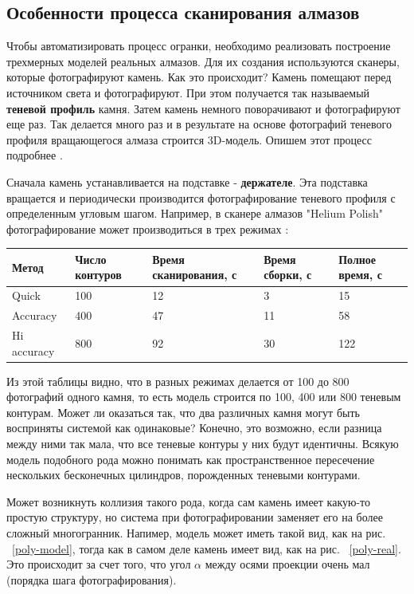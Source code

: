\documentclass[a4paper,12pt, titlepage]{article}
\begin{document}
\subsection{Особенности процесса сканирования алмазов}
\begin{flushleft}
Чтобы автоматизировать процесс огранки, необходимо реализовать построение трехмерных моделей
реальных алмазов. Для их создания используются сканеры, которые фотографируют камень. 
Как это происходит? Камень помещают перед источником света и фотографируют. При этом получается
так называемый \textbf{теневой профиль} камня. Затем камень немного поворачивают и фотографируют 
еще раз. Так делается много раз и в результате на основе фотографий теневого профиля вращающегося
алмаза строится 3D-модель. Опишем этот процесс подробнее \cite{doc-1}.
\end{flushleft}
\begin{flushleft}
 Сначала камень устанавливается на подставке - \textbf{держателе}. Эта подставка вращается и 
периодически производится фотографирование теневого профиля с определенным угловым шагом. Например, в 
сканере алмазов "Helium Polish" фотографирование может производиться в трех режимах \cite{doc-2}:
\end{flushleft}
\begin{flushleft}
 \begin{tabular}{|p{2.5cm}|p{2.5cm}|p{2.5cm}|p{2.5cm}|p{2.5cm}|}
  \hline
  Метод & Число контуров & Время сканирования, с & Время сборки, с & Полное время, с  \\
  \hline
  Quick & 100 & 12 & 3 & 15 \\
  \hline
  Accuracy & 400 & 47 & 11 & 58 \\
  \hline
  Hi accuracy & 800 & 92 & 30 & 122 \\
  \hline
 \end{tabular}
\end{flushleft}
\begin{flushleft}
 Из этой таблицы видно, что в разных режимах делается от 100 до 800 фотографий одного камня, то есть
модель строится по 100, 400 или 800 теневым контурам. Может ли оказаться так, что два различных камня 
могут быть восприняты системой как одинаковые? Конечно, это возможно, если разница между ними так мала,
что все теневые контуры у них будут идентичны. Всякую модель подобного рода можно понимать как 
пространственное пересечение нескольких бесконечных цилиндров, порожденных теневыми контурами.
\end{flushleft}
\begin{flushleft}
  Может возникнуть коллизия такого рода, когда сам камень имеет какую-то простую структуру, но система
при фотографировании заменяет его на более сложный многогранник. Напимер, модель может иметь такой вид,
как на рис. ~\ref{poly-model}, тогда как в самом деле камень имеет вид, как на рис. ~\ref{poly-real}. Это происходит за счет того, что
угол $\alpha$ между осями проекции очень мал (порядка шага фотографирования).
\end{flushleft}
\end{document}
